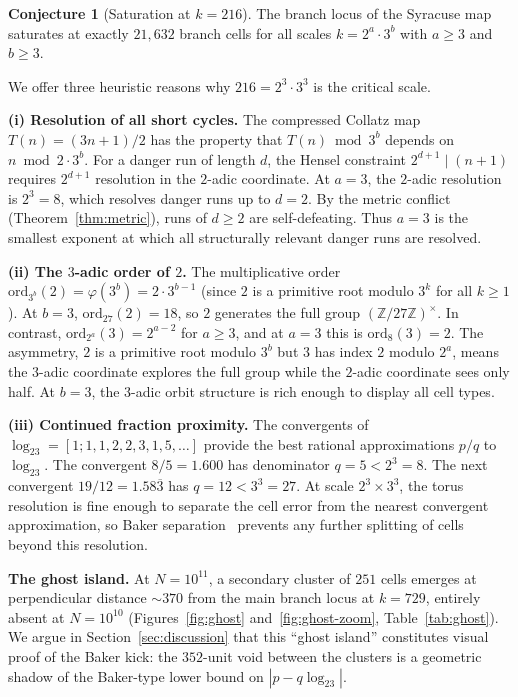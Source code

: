 \documentclass{CUP-JNL-FMP}%
\theoremstyle{definition}
\newtheorem{conjecture}[theorem]{Conjecture}
\numberwithin{equation}{section}
\newcommand{\ZZ}{\mathbb{Z}}
\newcommand{\logb}{\log_2}
\begin{document}
\begin{conjecture}[Saturation at $k = 216$]\label{conj:saturation}
  The branch locus of the Syracuse map saturates at exactly $21{,}632$ branch
  cells for all scales $k = 2^a \cdot 3^b$ with $a \geq 3$ and $b \geq 3$.
\end{conjecture}

We offer three heuristic reasons why $216 = 2^3 \cdot 3^3$ is the critical
scale.

\medskip\noindent\textbf{(i) Resolution of all short cycles.}
The compressed Collatz map $T(n) = (3n+1)/2$ has the property that $T(n) \bmod 3^b$
depends on $n \bmod 2 \cdot 3^b$.  For a danger run of length $d$, the Hensel
constraint $2^{d+1} \mid (n+1)$ requires $2^{d+1}$ resolution in the $2$-adic
coordinate.  At $a = 3$, the $2$-adic resolution is $2^3 = 8$, which resolves
danger runs up to $d = 2$.  By the metric conflict (Theorem~\ref{thm:metric}),
runs of $d \geq 2$ are self-defeating.  Thus $a = 3$ is the smallest exponent
at which all structurally relevant danger runs are resolved.

\medskip\noindent\textbf{(ii) The $3$-adic order of $2$.}
The multiplicative order $\mathrm{ord}_{3^b}(2) = \varphi(3^b) = 2 \cdot 3^{b-1}$
(since $2$ is a primitive root modulo $3^k$ for all $k \geq 1$).  At $b = 3$,
$\mathrm{ord}_{27}(2) = 18$, so $2$ generates the full group $(\ZZ/27\ZZ)^\times$.
In contrast, $\mathrm{ord}_{2^a}(3) = 2^{a-2}$ for $a \geq 3$, and at
$a = 3$ this is $\mathrm{ord}_8(3) = 2$.  The asymmetry, $2$ is a primitive root
modulo $3^b$ but $3$ has index $2$ modulo $2^a$, means the $3$-adic coordinate
explores the full group while the $2$-adic coordinate sees only half.
At $b = 3$, the $3$-adic orbit structure is rich enough to display all cell types.

\medskip\noindent\textbf{(iii) Continued fraction proximity.}
The convergents of $\logb 3 = [1; 1, 1, 2, 2, 3, 1, 5, \ldots]$ provide the
best rational approximations $p/q$ to $\logb 3$.  The convergent $8/5 = 1.600$
has denominator $q = 5 < 2^3 = 8$.  The next convergent $19/12 = 1.58\overline{3}$
has $q = 12 < 3^3 = 27$.  At scale $2^3 \times 3^3$, the torus resolution is
fine enough to separate the cell error from the nearest convergent approximation,
so Baker separation~\cite{Baker1975} prevents any further splitting of cells
beyond this resolution.

\medskip\noindent\textbf{The ghost island.}
At $N = 10^{11}$, a secondary cluster of $251$ cells emerges at perpendicular
distance ${\sim}370$ from the main branch locus at $k = 729$, entirely absent
at $N = 10^{10}$ (Figures~\ref{fig:ghost} and~\ref{fig:ghost-zoom},
Table~\ref{tab:ghost}). We argue in Section~\ref{sec:discussion} that this
``ghost island'' constitutes visual proof of the Baker kick: the $352$-unit
void between the clusters is a geometric shadow of the Baker-type lower bound
on $|p - q \logb 3|$.
\end{document}
